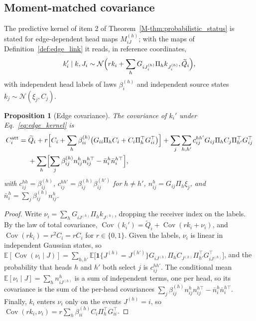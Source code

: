 \documentclass[11pt]{article}
\newtheorem{proposition}[theorem]{Proposition}
\theoremstyle{definition}
\theoremstyle{remark}
\newcommand{\E}{\mathbb E}
\newcommand{\Gauss}{\mathcal N}
\newcommand{\Cov}{\operatorname{Cov}}
\newcommand{\Mref}[1]{\ref{M-#1}}
\begin{document}
\subsection{Moment-matched covariance}

The predictive kernel of item 2 of Theorem~\Mref{thm:probabilistic_status} is stated for edge-dependent head maps $M^{(h)}_{iJ}$; with the maps of Definition~\ref{def:edge_link} it reads, in reference coordinates,
\begin{equation}
k_i'\mid k,J_i\sim\Gauss\Bigl(rk_i+\sum_hG_{iJ_i^{(h)}}\Pi_hk_{J_i^{(h)}},\widetilde Q_i\Bigr),
\label{eq:edge_kernel}
\end{equation}
with independent head labels of laws $\beta_i^{(h)}$ and independent source states $k_j\sim\Gauss(\xi_j,C_j)$.

\begin{proposition}[Edge covariance]
\label{prop:edge_covariance}
The covariance of $k_i'$ under Eq.~\eqref{eq:edge_kernel} is
\begin{equation}
\begin{aligned}
C_i^{\mathrm{att}}={}&\widetilde Q_i+r\Bigl[C_i+\sum_h\beta_{ii}^{(h)}\bigl(G_{ii}\Pi_hC_i+C_i\Pi_h^\top G_{ii}^\top\bigr)\Bigr]+\sum_j\sum_{h,h'}c_{ij}^{hh'}G_{ij}\Pi_hC_j\Pi_{h'}^\top G_{ij}^\top\\
&+\sum_h\Bigl[\sum_j\beta_{ij}^{(h)}n_{ij}^{h}n_{ij}^{h\top}-\bar n_i^{h}\bar n_i^{h\top}\Bigr],
\end{aligned}
\label{eq:edge_covariance}
\end{equation}
with $c_{ij}^{hh}=\beta_{ij}^{(h)}$, $c_{ij}^{hh'}=\beta_{ij}^{(h)}\beta_{ij}^{(h')}$ for $h\ne h'$, $n_{ij}^h=G_{ij}\Pi_h\xi_j$, and $\bar n_i^h=\sum_j\beta_{ij}^{(h)}n_{ij}^h$.
\end{proposition}
\begin{proof}
Write $\nu_i=\sum_hG_{iJ^{(h)}}\Pi_hk_{J^{(h)}}$, dropping the receiver index on the labels. By the law of total covariance, $\Cov(k_i')=\widetilde Q_i+\Cov(rk_i+\nu_i)$, and $\Cov(rk_i)=r^2C_i=rC_i$ for $r\in\{0,1\}$. Given the labels, $\nu_i$ is linear in independent Gaussian states, so $\E[\Cov(\nu_i\mid J)]=\sum_{h,h'}\E\bigl[\mathbf 1\{J^{(h)}=J^{(h')}\}G_{iJ^{(h)}}\Pi_hC_{J^{(h)}}\Pi_{h'}^\top G_{iJ^{(h)}}^\top\bigr]$, and the probability that heads $h$ and $h'$ both select $j$ is $c_{ij}^{hh'}$. The conditional mean $\E[\nu_i\mid J]=\sum_hn_{iJ^{(h)}}^h$ is a sum of independent terms, one per head, so its covariance is the sum of the per-head covariances $\sum_j\beta_{ij}^{(h)}n_{ij}^hn_{ij}^{h\top}-\bar n_i^h\bar n_i^{h\top}$. Finally, $k_i$ enters $\nu_i$ only on the events $J^{(h)}=i$, so $\Cov(rk_i,\nu_i)=r\sum_h\beta_{ii}^{(h)}C_i\Pi_h^\top G_{ii}^\top$.
\end{proof}
\end{document}
